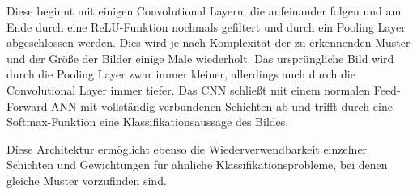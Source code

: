 Diese beginnt mit einigen Convolutional Layern, die aufeinander folgen und am Ende durch eine ReLU-Funktion nochmals gefiltert und durch ein Pooling Layer abgeschlossen werden. Dies wird je nach Komplexität der zu erkennenden Muster und der Größe der Bilder einige Male wiederholt. Das ursprüngliche Bild wird durch die Pooling Layer zwar immer kleiner, allerdings auch durch die Convolutional Layer immer tiefer. Das CNN schließt mit einem normalen Feed-Forward ANN mit vollständig verbundenen Schichten ab und trifft durch eine Softmax-Funktion eine Klassifikationsaussage des Bildes. \cite{AurelienGeron.2018}

Diese Architektur ermöglicht ebenso die Wiederverwendbarkeit einzelner Schichten und Gewichtungen für ähnliche Klassifikationsprobleme, bei denen gleiche Muster vorzufinden sind. \cite{AurelienGeron.2018}
